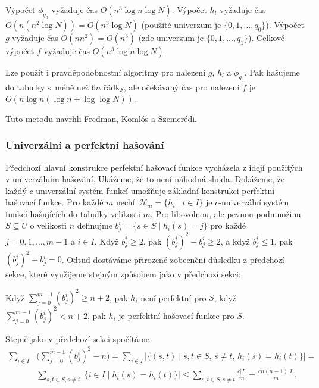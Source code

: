 \documentclass[a4paper,12pt]{article}
\begin{document}
Výpočet $\phi_{q_0}$ vyžaduje čas $O(n^3\log 
n\log N)$. Výpočet $h_l$ 
vyža\-du\-je čas $O(n(n^2\log N))=O(n^3\log N)$ (použité univerzum je 
$\{0,1,\dots,q_0\}$). Výpočet $g$ vyžaduje čas $O(nn^2
)=O(n^3)$ 
(zde univerzum je $\{0,1,\dots,q_1\}$). Celkově 
výpočet $f$ vyžaduje čas $O(n^3\log n\log N)$.

Lze použít i pravděpodobnostní algoritmy pro nalezení 
$g$, $h_l$ a $\phi_{q_0}$. Pak hašujeme do tabulky s~méně než $
6n$ 
řádky, ale očekávaný čas pro nalezení $f$ je 
$O(n\log n(\log n+\log\log N))$.


Tuto metodu navrhli Fredman, Komlós a Szemerédi.

\subsubsection{Univerzální a perfektní hašování}

Předchozí hlavní konstrukce perfektní hašovací funkce 
vycházela z idejí použitých v univerzálním hašování.  Ukážeme, 
že to není náhodná shoda. Dokážeme, že každý $
c$-univerzální 
systém funkcí umožňuje základní konstrukci perfektní hašovací 
funkce.  Pro každé $m$ nechť $\mathcal H_m=\{h_i\mid i\in I\}$ je $
c$-univerzální 
systém funkcí hašujících do ta\-bulky velikosti $
m$. Pro 
libovolnou, ale pevnou podmnožinu $S\subseteq U$ o velikosti $
n$ definujme 
$b_j^i=\{s\in S\mid h_i(s)=j\}$ pro každé $j=0,1,\dots,m-1$ a $
i\in I$. Když 
$b^i_j\ge 2$, pak $(b^i_j)^2-b^i_j\ge 2$, a když $b^i_j\le 1$, pak $
(b^i_j)^2-b^i_j=0$. Odtud 
dostáváme přirozené zobecnění důsledku z předchozí 
sekce, které využijeme stejným způsobem jako v 
předchozí sekci:

\begin{dusledek}Když $\sum_{j=0}^{m-1}(b^i_j)^2\ge n+2$, pak $h_i$ není 
perfektní pro $S$, když $\sum_{j=0}^{m-1}(b^i_j)^2<n+2$, pak $h_i$ je perfektní 
hašovací funkce pro $S$.
\end{dusledek}

Stejně jako v předchozí sekci spočítáme  
\begin{align*}\sum_{i\in I}&\big(\sum_{j=0}^{m-1}(b^i_j)^2-n\big)=\sum_{
i\in I}|\{(s,t)\mid s,t\in S,\,s\ne t,\,h_i(s)=h_i(t)\}|=\\
&\sum_{s,t\in S,s\ne t}|\{i\in I\mid h_i(s)=h_i(t)\}|\le\sum_{s,t
\in S,s\ne t}\frac {c|I|}m=\frac {cn(n-1)|I|}m.\end{align*}
\end{document}
